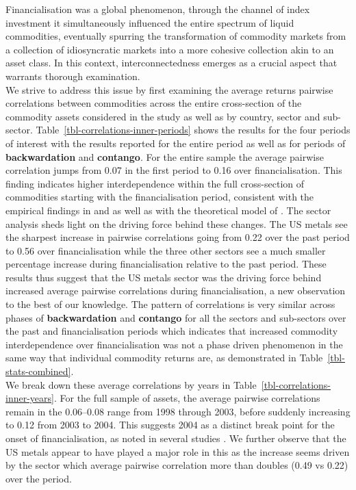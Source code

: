 \documentclass[
  authoryear,
  preprint,
  3p]{elsarticle}
\begin{document}
\medskip

Financialisation was a global phenomenon, through the channel of index
investment it simultaneously influenced the entire spectrum of liquid
commodities, eventually spurring the transformation of commodity markets
from a collection of idiosyncratic markets into a more cohesive
collection akin to an asset class. In this context, interconnectedness
emerges as a crucial aspect that warrants thorough examination.\\
We strive to address this issue by first examining the average returns
pairwise correlations between commodities across the entire
cross-section of the commodity assets considered in the study as well as
by country, sector and sub-sector.
Table~\ref{tbl-correlations-inner-periods} shows the results for the
four periods of interest with the results reported for the entire period
as well as for periods of \textbf{backwardation} and \textbf{contango}.
For the entire sample the average pairwise correlation jumps from 0.07
in the first period to 0.16 over financialisation. This finding
indicates higher interdependence within the full cross-section of
commodities starting with the financialisation period, consistent with
the empirical findings in \citet{fryMcKibbin_evolution_2023} and
\citet{mayer_financialization_2017} as well as with the theoretical
model of \citet{basak_model_2016}. The sector analysis sheds light on
the driving force behind these changes. The US metals see the sharpest
increase in pairwise correlations going from 0.22 over the past period
to 0.56 over financialisation while the three other sectors see a much
smaller percentage increase during financialisation relative to the past
period. These results thus suggest that the US metals sector was the
driving force behind increased average pairwise correlations during
financialisation, a new observation to the best of our knowledge. The
pattern of correlations is very similar across phases of
\textbf{backwardation} and \textbf{contango} for all the sectors and
sub-sectors over the past and financialisation periods which indicates
that increased commodity interdependence over financialisation was not a
phase driven phenomenon in the same way that individual commodity
returns are, as demonstrated in Table~\ref{tbl-stats-combined}.\\
We break down these average correlations by years in
Table~\ref{tbl-correlations-inner-years}. For the full sample of assets,
the average pairwise correlations remain in the 0.06--0.08 range from
1998 through 2003, before suddenly increasing to 0.12 from 2003 to 2004.
This suggests 2004 as a distinct break point for the onset of
financialisation, as noted in several studies
\citep{baker_financialization_2021, tang_index_2012}. We further observe
that the US metals appear to have played a major role in this as the
increase seems driven by the sector which average pairwise correlation
more than doubles (0.49 vs 0.22) over the period.
\end{document}
